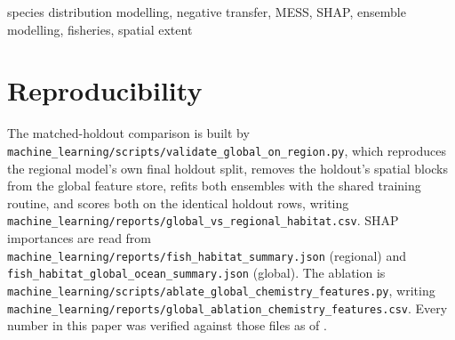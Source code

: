 \documentclass[conference]{IEEEtran}
\begin{document}
\begin{IEEEkeywords}
species distribution modelling, negative transfer, MESS, SHAP, ensemble
modelling, fisheries, spatial extent
\end{IEEEkeywords}



\section*{Reproducibility}
The matched-holdout comparison is built by
\texttt{machine\_learning/scripts/validate\_global\_on\_region.py}, which
reproduces the regional model's own final holdout split, removes the holdout's
spatial blocks from the global feature store, refits both ensembles with the
shared training routine, and scores both on the identical holdout rows,
writing \texttt{machine\_learning/reports/global\_vs\_regional\_habitat.csv}.
SHAP importances are read from
\texttt{machine\_learning/reports/fish\_habitat\_summary.json} (regional) and
\texttt{fish\_habitat\_global\_ocean\_summary.json} (global). The ablation is
\texttt{machine\_learning/scripts/ablate\_global\_chemistry\_features.py}, writing
\texttt{machine\_learning/reports/global\_ablation\_chemistry\_features.csv}.
Every number in this paper was verified against those files as of \AsOf{}.



\end{document}
